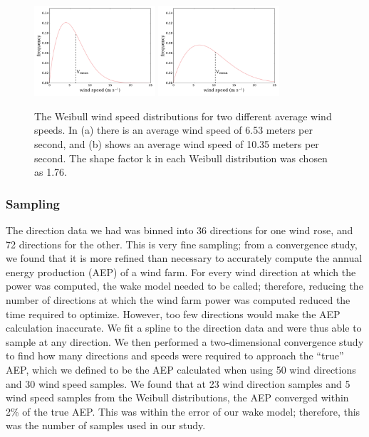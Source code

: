 \documentclass[WESD, manuscript]{copernicus}
\begin{document}
\begin{figure}[htbp]
  \centering
  \includegraphics[trim={0 0.7cm 0 0.4cm},clip,width=0.4\textwidth]{Figures/weibull_6_53.pdf}\label{653}
  \includegraphics[trim={0 0.7cm 0 0.4cm},clip,width=0.4\textwidth]{Figures/weibull_10_35.pdf}\label{1035}
  \caption{\label{weibull} The Weibull wind speed distributions for two different average wind speeds. In (a) there is an average wind speed of 6.53 meters per second, and (b) shows an average wind speed of 10.35 meters per second. The shape factor k in each Weibull distribution was chosen as 1.76.}
\end{figure}


\subsubsection{Sampling}
The direction data we had was binned into 36 directions for one wind rose, and 72 directions for the other. This is very fine sampling;
from a convergence study, we found that it is more refined than necessary to accurately compute the annual energy production (AEP) of a wind farm. 
For every wind direction at which the power was computed, the wake model needed to be called; therefore, reducing the number of directions at which the wind farm power was computed reduced the time required to optimize. 
However, too few directions would make the AEP calculation inaccurate. We fit a spline to the direction data and were thus able to sample at any direction. We then performed a two-dimensional convergence study to find how many directions and speeds were required to approach the ``true'' AEP, which we defined to be the AEP calculated when using 50 wind directions and 30 wind speed samples. 
We found that at 23 wind direction samples and 5 wind speed samples from the Weibull distributions, the AEP converged within 2\% of the true AEP. This was within the error of our wake model; therefore, this was the number of samples used in our study. 
\end{document}
